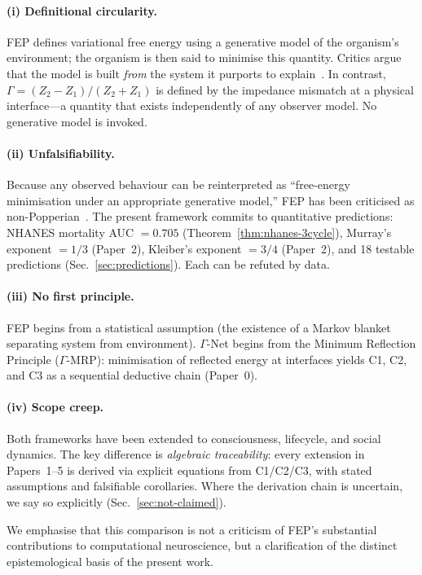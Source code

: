\documentclass[aps,pre,twocolumn,superscriptaddress,floatfix]{revtex4-2}
\begin{document}
\paragraph{(i) Definitional circularity.}
FEP defines variational free energy using a generative
model of the organism's environment; the organism is
then said to minimise this quantity.
Critics argue that the model is built {\em from\/}
the system it purports to explain~\cite{Colombo2021}.
In contrast, $\Gamma = (Z_2-Z_1)/(Z_2+Z_1)$ is defined
by the impedance mismatch at a physical interface---a
quantity that exists independently of any observer model.
No generative model is invoked.

\paragraph{(ii) Unfalsifiability.}
Because any observed behaviour can be reinterpreted as
``free-energy minimisation under an appropriate
generative model,'' FEP has been criticised as
non-Popperian~\cite{Andrews2021}.
The present framework commits to quantitative predictions:
NHANES mortality AUC $= 0.705$ (Theorem~\ref{thm:nhanes-3cycle}),
Murray's exponent $= 1/3$
(Paper~2),
Kleiber's exponent $= 3/4$
(Paper~2),
and 18 testable predictions (Sec.~\ref{sec:predictions}).
Each can be refuted by data.

\paragraph{(iii) No first principle.}
FEP begins from a statistical assumption (the existence
of a Markov blanket separating system from environment).
$\Gamma$-Net begins from the Minimum Reflection Principle
($\Gamma$-MRP): minimisation of reflected energy at
interfaces yields C1, C2, and C3 as a sequential
deductive chain (Paper~0).

\paragraph{(iv) Scope creep.}
Both frameworks have been extended to consciousness,
lifecycle, and social dynamics.
The key difference is {\em algebraic traceability\/}:
every extension in Papers~1--5 is derived via
explicit equations from C1/C2/C3, with stated
assumptions and falsifiable corollaries.
Where the derivation chain is uncertain, we
say so explicitly (Sec.~\ref{sec:not-claimed}).

We emphasise that this comparison is not a criticism
of FEP's substantial contributions to computational
neuroscience, but a clarification of the distinct
epistemological basis of the present work.
\end{document}
